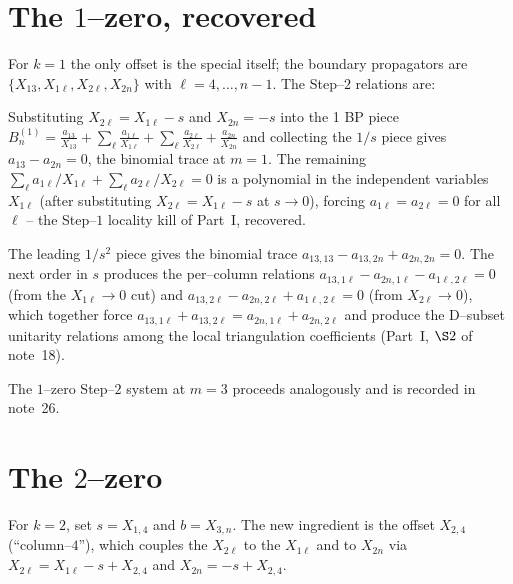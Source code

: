 \documentclass[11pt]{article}
\theoremstyle{definition}
\newcommand{\X}[1]{X_{#1}}
\begin{document}
\section{The $1$--zero, recovered}
For $k=1$ the only offset is the special itself; the boundary propagators are
$\{\X{13},\X{1\ell},\X{2\ell},\X{2n}\}$ with $\ell=4,\dots,n-1$. The Step--$2$ relations are:
\begin{description}[topsep=2pt,itemsep=2pt,leftmargin=2em]
  \item[$m=1$ (1 BP).] Substituting $\X{2\ell}=\X{1\ell}-s$ and $\X{2n}=-s$ into the 1 BP piece
  $B_n^{(1)}\!=\!\frac{a_{13}}{\X{13}}+\sum_\ell\frac{a_{1\ell}}{\X{1\ell}}+\sum_\ell\frac{a_{2\ell}}{\X{2\ell}}+\frac{a_{2n}}{\X{2n}}$
  and collecting the $1/s$ piece gives $a_{13}-a_{2n}=0$, the binomial trace at $m=1$. The
  remaining $\sum_\ell a_{1\ell}/\X{1\ell}+\sum_\ell a_{2\ell}/\X{2\ell}=0$ is a polynomial in the
  independent variables $\X{1\ell}$ (after substituting $\X{2\ell}=\X{1\ell}-s$ at $s\to0$), forcing
  $a_{1\ell}=a_{2\ell}=0$ for all $\ell$ -- the Step--$1$ locality kill of Part~I, recovered.
  \item[$m=2$ (2 BP).] The leading $1/s^2$ piece gives the binomial trace $a_{13,13}-a_{13,2n}+a_{2n,2n}=0$.
  The next order in $s$ produces the per--column relations
  $a_{13,1\ell}-a_{2n,1\ell}-a_{1\ell,2\ell}=0$ (from the $\X{1\ell}\to0$ cut) and
  $a_{13,2\ell}-a_{2n,2\ell}+a_{1\ell,2\ell}=0$ (from $\X{2\ell}\to0$), which together force
  $a_{13,1\ell}+a_{13,2\ell}=a_{2n,1\ell}+a_{2n,2\ell}$ and produce the D--subset unitarity
  relations among the local triangulation coefficients (Part~I, $\S2$ of note~18).
\end{description}
The $1$--zero Step--$2$ system at $m=3$ proceeds analogously and is recorded in note~26.

\section{The $2$--zero}
For $k=2$, set $s=\X{1,4}$ and $b=\X{3,n}$. The new ingredient is the offset $\X{2,4}$
(``column--$4$''), which couples the $\X{2\ell}$ to the $\X{1\ell}$ and to $\X{2n}$ via
$\X{2\ell}=\X{1\ell}-s+\X{2,4}$ and $\X{2n}=-s+\X{2,4}$.
\end{document}

